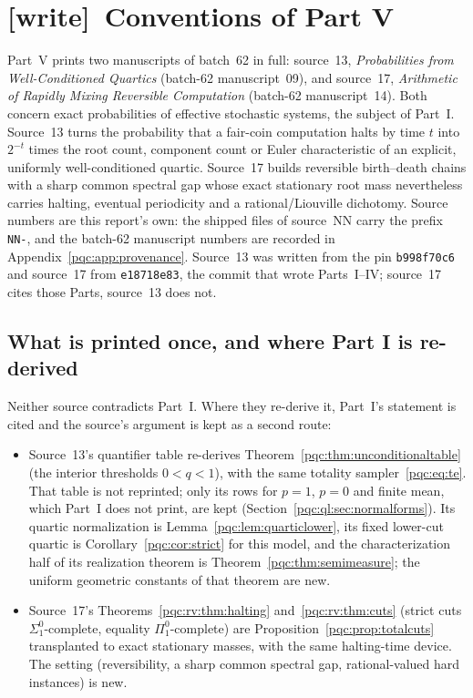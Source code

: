 \documentclass[11pt,letterpaper]{article}
\numberwithin{equation}{section}
\theoremstyle{definition}
\theoremstyle{remark}
\newcommand{\code}[1]{\nolinkurl{#1}}
\newcommand{\wtag}{\textup{[write]}}
\newcommand{\sigone}{\Sigma^0_1}
\newcommand{\pione}{\Pi^0_1}
\begin{document}
\section{\wtag\ Conventions of Part V}
\label{pqc:conv:b62-V}

Part~V prints two manuscripts of batch~62 in full: source~13, \emph{Probabilities
from Well-Conditioned Quartics} (batch-62 manuscript~09), and source~17,
\emph{Arithmetic of Rapidly Mixing Reversible Computation} (batch-62
manuscript~14). Both concern exact probabilities of effective stochastic
systems, the subject of Part~I. Source~13 turns the probability that a
fair-coin computation halts by time $t$ into $2^{-t}$ times the root count,
component count or Euler characteristic of an explicit, uniformly
well-conditioned quartic. Source~17 builds reversible birth--death chains with
a sharp common spectral gap whose exact stationary root mass nevertheless
carries halting, eventual periodicity and a rational/Liouville dichotomy.
Source numbers are this report's own: the shipped files of source~NN carry the
prefix \code{NN-}, and the batch-62 manuscript numbers are recorded in
Appendix~\ref{pqc:app:provenance}. Source~13 was written from the pin
\code{b998f70c6} and source~17 from \code{e18718e83}, the commit that wrote
Parts~I--IV; source~17 cites those Parts, source~13 does not.

\subsection{What is printed once, and where Part I is re-derived}
Neither source contradicts Part~I. Where they re-derive it, Part~I's statement
is cited and the source's argument is kept as a second route:
\begin{itemize}
\item Source~13's quantifier table re-derives
Theorem~\ref{pqc:thm:unconditionaltable} (the interior thresholds
$0<q<1$), with the same totality sampler~\eqref{pqc:eq:te}. That table is not
reprinted; only its rows for $p=1$, $p=0$ and finite mean, which Part~I does
not print, are kept (Section~\ref{pqc:ql:sec:normalforms}). Its quartic
normalization is Lemma~\ref{pqc:lem:quarticlower}, its fixed lower-cut quartic
is Corollary~\ref{pqc:cor:strict} for this model, and the characterization half
of its realization theorem is Theorem~\ref{pqc:thm:semimeasure}; the uniform
geometric constants of that theorem are new.
\item Source~17's Theorems~\ref{pqc:rv:thm:halting} and~\ref{pqc:rv:thm:cuts}
(strict cuts $\sigone$-complete, equality $\pione$-complete) are
Proposition~\ref{pqc:prop:totalcuts} transplanted to exact stationary masses,
with the same halting-time device. The setting (reversibility, a sharp common
spectral gap, rational-valued hard instances) is new.
\end{itemize}
\end{document}
